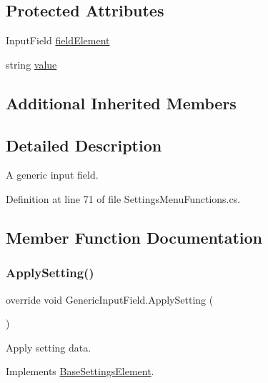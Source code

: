 \subsection*{Protected Attributes}
\begin{DoxyCompactItemize}
\item 
Input\+Field \hyperlink{class_generic_input_field_a5147fb47b5c0f5391cd71249ea17cf3f}{field\+Element}
\item 
string \hyperlink{class_generic_input_field_ae0165e8660f08a322838bdae1e8eb473}{value}
\end{DoxyCompactItemize}
\subsection*{Additional Inherited Members}


\subsection{Detailed Description}
A generic input field. 



Definition at line 71 of file Settings\+Menu\+Functions.\+cs.



\subsection{Member Function Documentation}
\mbox{\label{class_generic_input_field_a97f9b49ecff8b1f6a8c837428c46ef27}} 
\subsubsection{\texorpdfstring{Apply\+Setting()}{ApplySetting()}}
{\footnotesize\ttfamily override void Generic\+Input\+Field.\+Apply\+Setting (\begin{DoxyParamCaption}{ }\end{DoxyParamCaption})\hspace{0.3cm}{\ttfamily [virtual]}}



Apply setting data. 



Implements \hyperlink{class_base_settings_element_aecb484325110e7b97ec6e4d92d856ab1}{Base\+Settings\+Element}.



